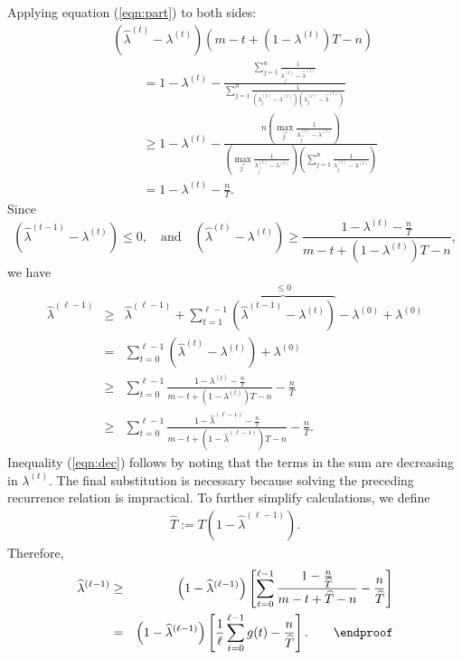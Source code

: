 \documentclass[final,leqno,onefignum,onetabnum]{siamltex1213}
\begin{document}
Applying equation (\ref{eqn:part}) to both sides:
\begin{eqnarray*}
&&{\displaystyle \left(\widehat{\lambda}^{(t)}-\lambda^{(t)}\right)\left(m-t+\left(1-\lambda^{(t)}\right)T-n\right)}\\
&& {\displaystyle\hspace{1cm}=1-\lambda^{(t)}-\frac{\sum_{j=1}^n\frac{1}{\lambda_j^{(t)}-\widehat{\lambda}^{(t)}}}{\sum_{j=1}^n\frac{1}{\left(\lambda_j^{(t)}-\lambda^{(t)}\right)\left(\lambda^{(t)}_j-\widehat{\lambda}^{(t)}\right)}} }\\
&& {\displaystyle \hspace{1cm}\ge1-\lambda^{(t)}-\frac{n \left(\max_{j^*} \frac{1}{\lambda^{(t)}_{j^*}-\lambda^{(t)}} \right)}{ \left(\max_{j^*} \frac{1}{\lambda^{(t)}_{j^*}-\lambda^{(t)}} \right) \left(\sum_{j=1}^n\frac{1}{\lambda^{(t)}_j-\lambda^{(t)}}\right)} } \\
&& {\displaystyle \hspace{1cm}=1-\lambda^{(t)}-\frac{n}{T}.}
\end{eqnarray*}
Since 
\[{\displaystyle \left( \widehat{\lambda}^{(t-1)} - \lambda^{(t)} \right) \leq 0, \quad \mbox{and} \quad \left(\widehat{\lambda}^{(t)}-\lambda^{(t)} \right) \geq \frac{1-\lambda^{(t)}-\frac{n}{T}}{m-t+\left(1-\lambda^{(t)}\right)T-n},}\]
we have
\begin{eqnarray}
{\displaystyle \widehat{\lambda}^{(\ell - 1)}}&\ge& {\displaystyle \widehat{\lambda}^{(\ell - 1)} + \sum_{t=1}^{\ell - 1} \overbrace{\left( \widehat{\lambda}^{(t-1)} - \lambda^{(t)} \right)}^{\leq 0} -\lambda^{(0)} + \lambda^{(0)} }\nonumber  \\
&=& {\displaystyle \sum_{t=0}^{\ell - 1}\left(\widehat{\lambda}^{(t)}-\lambda^{(t)}\right)+\lambda^{(0)}}\nonumber\\
&\ge&{\displaystyle \sum_{t=0}^{\ell - 1}\frac{1-\lambda^{(t)}-\frac{n}{T}}{m-t+\left(1-\lambda^{(t)}\right)T-n}-\frac{n}{T}} \nonumber \\
&\ge&{\displaystyle\sum_{t=0}^{\ell - 1}\frac{1-\widehat{\lambda}^{(\ell - 1)}-\frac{n}{T}}{m-t+\left(1-\widehat{\lambda}^{(\ell - 1)}\right)T-n}-\frac{n}{T}}. \label{eqn:dec}
\end{eqnarray}
Inequality (\ref{eqn:dec}) follows by noting that the
terms in the sum are decreasing in $\lambda^{(t)}$.  The final
substitution is necessary because solving the preceding recurrence
relation is impractical.  To further simplify calculations, we define
\begin{eqnarray}
\widehat{T}:=T\left(1-\widehat{\lambda}^{(\ell - 1)}\right).\nonumber
\end{eqnarray}
Therefore,
\begin{eqnarray}
\widehat{\lambda}^{(\ell - 1)}&\ge&\left(1-\widehat{\lambda}^{(\ell - 1)}\right)\left[\sum_{t=0}^{\ell - 1}\frac{1-\frac{n}{\widehat{T}}}{m-t+\widehat{T}-n}-\frac{n}{\widehat{T}}\right]\nonumber\\
&=&\left(1-\widehat{\lambda}^{(\ell - 1)}\right)\left[ \frac{1}{\ell} \sum_{t=0}^{\ell - 1} g(t)-\frac{n}{\widehat{T}}\right].\hspace{2 em}\endproof\nonumber
\end{eqnarray}
\end{document}
